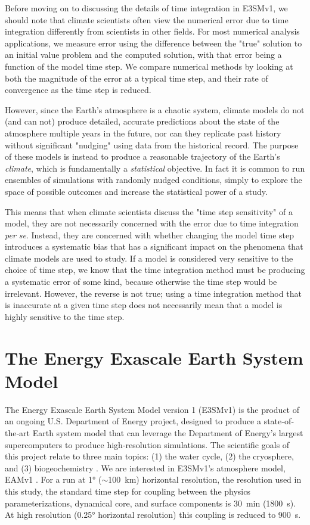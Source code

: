 \documentclass [11pt, proquest] {uwthesis}[2020/02/24]
\begin{document}
Before moving on to discussing the details of time integration in E3SMv1, we should note that climate scientists often view the numerical error due to time integration differently from scientists in other fields. For most numerical analysis applications, we measure error using the difference between the "true" solution to an initial value problem and the computed solution, with that error being a function of the model time step. We compare numerical methods by looking at both the magnitude of the error at a typical time step, and their rate of convergence as the time step is reduced.

However, since the Earth's atmosphere is a chaotic system, climate models do not (and can not) produce detailed, accurate predictions about the state of the atmosphere multiple years in the future, nor can they replicate past history without significant "nudging" using data from the historical record. The purpose of these models is instead to produce a reasonable trajectory of the Earth's \emph{climate}, which is fundamentally a \emph{statistical} objective. In fact it is common to run ensembles of simulations with randomly nudged conditions, simply to explore the space of possible outcomes and increase the statistical power of a study.

This means that when climate scientists discuss the "time step sensitivity" of a model, they are not necessarily concerned with the error due to time integration \emph{per se}. Instead, they are concerned with whether changing the model time step introduces a systematic bias that has a significant impact on the phenomena that climate models are used to study. If a model is considered very sensitive to the choice of time step, we know that the time integration method must be producing a systematic error of some kind, because otherwise the time step would be irrelevant. However, the reverse is not true; using a time integration method that is inaccurate at a given time step does not necessarily mean that a model is highly sensitive to the time step.

\section{The Energy Exascale Earth System Model} \label{sec:E3SM-intro}

The Energy Exascale Earth System Model version 1 (E3SMv1) is the product of an ongoing U.S. Department of Energy project, designed to produce a state‐of‐the‐art Earth system model that can leverage the Department of Energy's largest supercomputers to produce high‐resolution simulations. The scientific goals of this project relate to three main topics: (1) the water cycle, (2) the cryosphere, and (3) biogeochemistry \parencite{E3SM-v1}. We are interested in E3SMv1’s atmosphere model, EAMv1 \parencite{EAM-v1,Xie2018}. For a run at \ang{1} ($\sim$\SI{100}{\kilo\meter}) horizontal resolution, the resolution used in this study, the standard time step for coupling between the physics parameterizations, dynamical core, and surface components is \SI{30}{\minute} (\SI{1800}{\second}). At high resolution (\ang{0.25} horizontal resolution) this coupling is reduced to \SI{900}{\second}.
\end{document}
